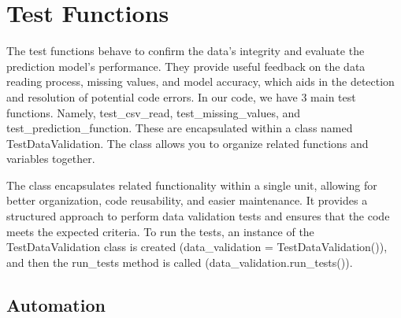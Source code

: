 %
%


\chapter{Test Functions}
	
	The test functions behave to confirm the data's integrity and evaluate the prediction model's performance. They provide useful feedback on the data reading process, missing values, and model accuracy, which aids in the detection and resolution of potential code errors.
	In our code, we have 3 main test functions. Namely, test\_csv\_read, test\_missing\_values, and test\_prediction\_function. These are encapsulated within a class named TestDataValidation. The class allows you to organize related functions and variables together.
	
	The class encapsulates related functionality within a single unit, allowing for better organization, code reusability, and easier maintenance. It provides a structured approach to perform data validation tests and ensures that the code meets the expected criteria. 
	To run the tests, an instance of the TestDataValidation class is created (data\_validation = TestDataValidation()), and then the run\_tests method is called (data\_validation.run\_tests()).
	
	\section{Automation }
	
